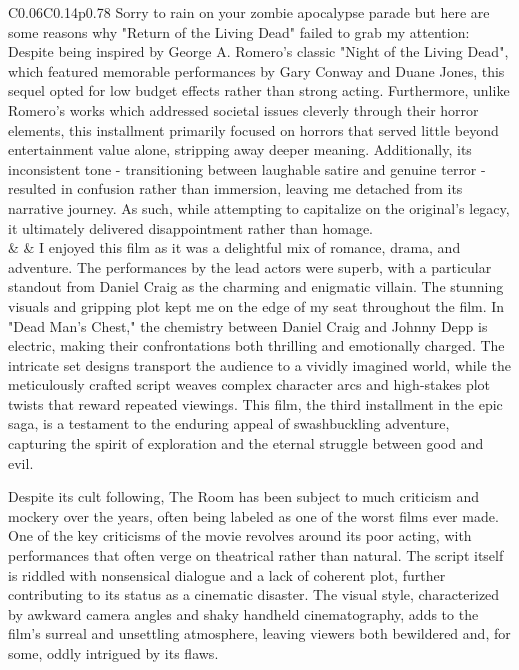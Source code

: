 \begin{table*}[!t]
{\begin{tabular}{C{0.06\textwidth}C{0.14\textwidth}p{0.78\textwidth}}
 Sorry to rain on your zombie apocalypse parade but here are some reasons why "Return of the Living Dead" failed to grab my attention: Despite being inspired by George A. Romero's classic "Night of the Living Dead", which featured memorable performances by Gary Conway and Duane Jones, this sequel opted for low budget effects rather than strong acting. Furthermore, unlike Romero's works which addressed societal issues cleverly through their horror elements, this installment primarily focused on horrors that served little beyond entertainment value alone, stripping away deeper meaning. Additionally, its inconsistent tone - transitioning between laughable satire and genuine terror - resulted in confusion rather than immersion, leaving me detached from its narrative journey. As such, while attempting to capitalize on the original's legacy, it ultimately delivered disappointment rather than homage.
\\ 
\midrule
\IMDb & \fewgen & 
 I enjoyed this film as it was a delightful mix of romance, drama, and adventure. The performances by the lead actors were superb, with a particular standout from Daniel Craig as the charming and enigmatic villain. The stunning visuals and gripping plot kept me on the edge of my seat throughout the film. In "Dead Man's Chest," the chemistry between Daniel Craig and Johnny Depp is electric, making their confrontations both thrilling and emotionally charged. The intricate set designs transport the audience to a vividly imagined world, while the meticulously crafted script weaves complex character arcs and high-stakes plot twists that reward repeated viewings. This film, the third installment in the epic saga, is a testament to the enduring appeal of swashbuckling adventure, capturing the spirit of exploration and the eternal struggle between good and evil.

 Despite its cult following, The Room has been subject to much criticism and mockery over the years, often being labeled as one of the worst films ever made. One of the key criticisms of the movie revolves around its poor acting, with performances that often verge on theatrical rather than natural. The script itself is riddled with nonsensical dialogue and a lack of coherent plot, further contributing to its status as a cinematic disaster. The visual style, characterized by awkward camera angles and shaky handheld cinematography, adds to the film's surreal and unsettling atmosphere, leaving viewers both bewildered and, for some, oddly intrigued by its flaws.
\\ \bottomrule
\end{tabular}
\vspace{-1ex}
}
\caption{
Generated examples from \corrsyn-Hybrid and \fewgen{} on different tasks using Phi-3 mini (3-shot).
}
\vspace{-3ex}
\end{table*}